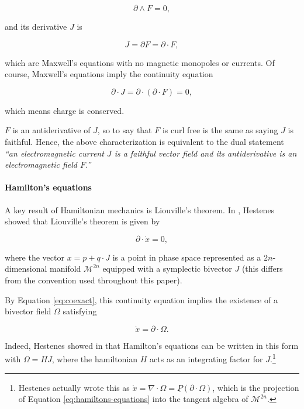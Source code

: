 \documentclass{article}
\begin{document}
\begin{equation}
  \partial \wedge F = 0,
\end{equation}

and its derivative $J$ is

\begin{equation}
  J = \partial F = \partial \cdot F,
\end{equation} 

which are Maxwell's equations with no magnetic monopoles or currents. Of course, Maxwell's equations imply the continuity equation

\begin{equation}
  \partial \cdot J = \partial \cdot (\partial \cdot F) = 0, \label{eq:continuity}
\end{equation} 

which means charge is conserved. 

$F$ is an antiderivative of $J$, so to say that $F$ is curl free is the same as saying $J$ is faithful. Hence, the above characterization is equivalent to the dual statement \emph{``an electromagnetic current $J$ is a faithful vector field and its antiderivative is an electromagnetic field $F$.''}

\paragraph{Hamilton's equations}

A key result of Hamiltonian mechanics is Liouville's theorem. In \cite{hestenes-hamilton}, Hestenes showed that Liouville's theorem is given by

\begin{equation}
  \partial \cdot \dot x = 0,\label{eq:hamilton-continuity}
\end{equation}

where the vector $x = p + q \cdot J$ is a point in phase space represented as a $2n$-dimensional manifold $\mathcal{M}^{2n}$ equipped with a symplectic bivector $J$ (this differs from the convention used throughout this paper).

By Equation \ref{eq:coexact}, this continuity equation implies the existence of a bivector field $\Omega$ satisfying

\begin{equation}
  \dot x = \partial \cdot \Omega. \label{eq:hamiltons-equations}
\end{equation}

Indeed, Hestenes showed in \cite{hestenes-hamilton} that Hamilton's equations can be written in this form with $\Omega = H J$, where the hamiltonian $H$ acts as an integrating factor for $J$.\footnote{Hestenes actually wrote this as $\dot x = \nabla \cdot \Omega = \underline P (\partial \cdot \Omega)$, which is the projection of Equation \ref{eq:hamiltons-equations} into the tangent algebra of $\mathcal{M}^{2n}$.}
\end{document}
